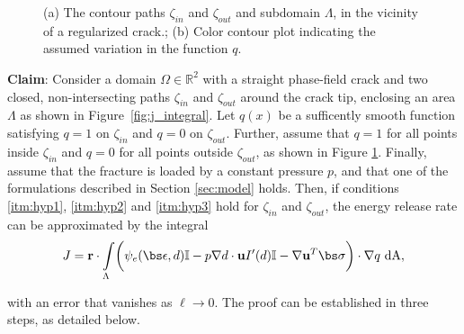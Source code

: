 \begin{figure}[ht]
\begin{subfigure}{.49\textwidth}
  \caption{}
  \label{fig:j_integral_q}
\end{subfigure}%
  \caption{(a) The contour paths $\zeta_{in}$ and $\zeta_{out}$ and subdomain $\Lambda$, in the vicinity of a regularized crack.; (b) Color contour plot indicating the assumed variation in the function $q$.  } 
  \label{fig:j_integral_pics}
\end{figure}


\medskip

\noindent\textbf{Claim}: Consider a domain $\Omega \in \mathbb{R}^2$ with a straight phase-field crack and two closed, non-intersecting paths $\zeta_{in}$ and $\zeta_{out}$ around the crack tip, enclosing an area $\Lambda$ as shown in Figure~\ref{fig:j_integral}. Let $q(x)$ be a sufficently smooth function satisfying $q = 1$ on $\zeta_{in}$ and $q = 0$ on $\zeta_{out}$. Further, assume that $q = 1$ for all points inside $\zeta_{in}$ and $q = 0$ for all points outside $\zeta_{out}$, as shown in Figure \ref{fig:j_integral_q}. Finally, assume that the fracture is loaded by a constant pressure $p$, and that one of the formulations described in Section \ref{sec:model} holds. Then, if conditions \ref{itm:hyp1}, \ref{itm:hyp2} and \ref{itm:hyp3} hold for $\zeta_{in}$ and $\zeta_{out}$, the energy release rate can be approximated by the  integral
\begin{equation}\label{j_integral_theorem}
    J = \textbf{r} \cdot \int\limits_{\Lambda} \biggl( \psi_e(\bs\epsilon, d)\mathbb{I} -p\nabla d\cdot\textbf{u}I'(d)\mathbb{I}  - \nabla \textbf{u}^T\bs \sigma \biggr) \cdot \nabla q\ \text{dA},
\end{equation}

\noindent with an error that vanishes as $\ell \rightarrow 0$. The proof can be established in three steps, as detailed below.

